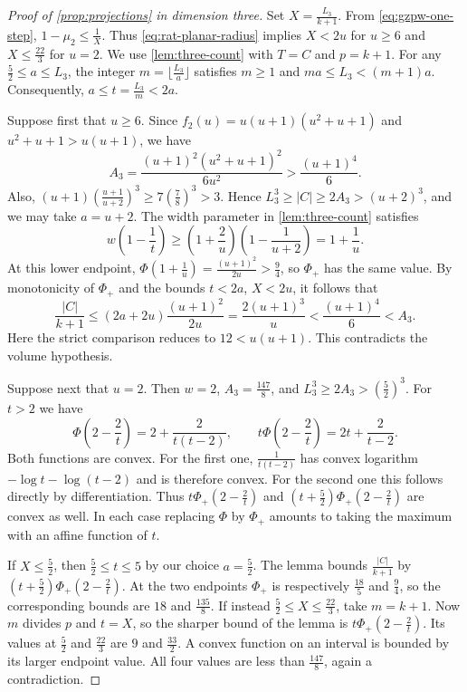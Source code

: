 \documentclass[reqno, 11pt]{article}
\numberwithin{equation}{section}
\theoremstyle{definition}
\begin{document}
\begin{proof}[Proof of \cref{prop:projections} in dimension three]
Set $X=\frac{L_3}{k+1}$. From \eqref{eq:gzpw-one-step},
$1-\mu_2\le\frac{1}{X}$. Thus \eqref{eq:rat-planar-radius} implies
$X<2u$ for $u\ge6$ and $X\le\frac{22}{3}$ for $u=2$.
We use \cref{lem:three-count} with $T=C$ and $p=k+1$. For any
$\frac{5}{2}\le a\le L_3$, the integer $m=\lfloor\frac{L_3}{a}\rfloor$
satisfies $m\ge1$ and $ma\le L_3<(m+1)a$. Consequently,
$a\le t=\frac{L_3}{m}<2a$.

Suppose first that $u\ge6$. Since $f_2(u)=u(u+1)(u^2+u+1)$
and $u^2+u+1>u(u+1)$, we have
\[
 A_3=\frac{(u+1)^2(u^2+u+1)^2}{6u^2}>\frac{(u+1)^4}{6}.
\]
Also, $(u+1)(\frac{u+1}{u+2})^3\ge7(\frac{7}{8})^3>3$. Hence
$L_3^3\ge|C|\ge2A_3>(u+2)^3$, and we may take $a=u+2$.
The width parameter in \cref{lem:three-count} satisfies
\[
 w\left(1-\frac{1}{t}\right)\ge
 \left(1+\frac{2}{u}\right)\left(1-\frac{1}{u+2}\right)=1+\frac{1}{u}.
\]
At this lower endpoint, $\Phi(1+\frac{1}{u})=\frac{(u+1)^2}{2u}>
\frac{9}{4}$, so $\Phi_+$ has the same value. By monotonicity of $\Phi_+$
and the bounds $t<2a$, $X<2u$, it follows that
\[
 \frac{|C|}{k+1}\le(2a+2u)\frac{(u+1)^2}{2u}
    =\frac{2(u+1)^3}{u}<\frac{(u+1)^4}{6}<A_3.
\]
Here the strict comparison reduces to $12<u(u+1)$. This contradicts
the volume hypothesis.

Suppose next that $u=2$. Then $w=2$, $A_3=\frac{147}{8}$, and
$L_3^3\ge2A_3>(\frac{5}{2})^3$. For $t>2$ we have
\[
 \Phi\left(2-\frac{2}{t}\right)=2+\frac{2}{t(t-2)},\qquad
 t\Phi\left(2-\frac{2}{t}\right)=2t+\frac{2}{t-2}.
\]
Both functions are convex. For the first one, $\frac{1}{t(t-2)}$
has convex logarithm $-\log t-\log(t-2)$ and is therefore convex.
For the second one this follows directly by differentiation.
Thus $t\Phi_+(2-\frac{2}{t})$ and $(t+\frac{5}{2})\Phi_+(2-\frac{2}{t})$
are convex as well. In each case replacing $\Phi$ by $\Phi_+$ amounts
to taking the maximum with an affine function of $t$.

If $X\le\frac{5}{2}$, then $\frac{5}{2}\le t\le5$ by our choice $a=\frac{5}{2}$. The lemma bounds $\frac{|C|}{k+1}$ by
$(t+\frac{5}{2})\Phi_+(2-\frac{2}{t})$. At the two endpoints
$\Phi_+$ is respectively $\frac{18}{5}$ and $\frac{9}{4}$, so the
corresponding bounds are $18$ and $\frac{135}{8}$. If instead
$\frac{5}{2}\le X\le\frac{22}{3}$, take $m=k+1$. Now $m$ divides $p$
and $t=X$, so the sharper bound of the lemma is $t\Phi_+(2-\frac{2}{t})$.
Its values at $\frac{5}{2}$ and $\frac{22}{3}$ are $9$ and $\frac{33}{2}$.
A convex function on an interval is bounded by its larger endpoint
value. All four values are less than $\frac{147}{8}$, again a contradiction.
\end{proof}
\end{document}
